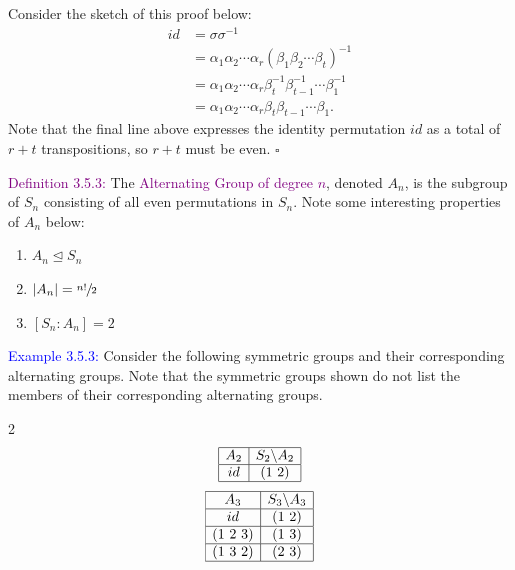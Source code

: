 \documentclass{article}
\begin{document}
Consider the sketch of this proof below:
\begin{align*}
    id &= \sigma \sigma^{-1} \\
    &= \alpha_1 \alpha_2 \cdots \alpha_r (\beta_1 \beta_2 \cdots \beta_t)^{-1} \\
    &= \alpha_1 \alpha_2 \cdots \alpha_r \beta_t^{-1} \beta_{t-1}^{-1} \cdots \beta_1^{-1} \\
    &= \alpha_1 \alpha_2 \cdots \alpha_r \beta_t \beta_{t-1} \cdots \beta_1.
\end{align*}
Note that the final line above expresses the identity permutation $id$ as a total of $r+t$ transpositions, so $r+t$ must be even. $\square$

\textcolor{purple}{Definition 3.5.3:} The \textcolor{purple}{Alternating Group of degree $n$}, denoted $A_n$, is the subgroup of $S_n$ 
consisting of all even permutations in $S_n$. Note some interesting properties of $A_n$ below:
\begin{enumerate}
    \item $A_n \trianglelefteq S_n$
    \item $|A_n|=\sfrac{n!}{2}$
    \item $[S_n:A_n]=2$
\end{enumerate}

\textcolor{blue}{Example 3.5.3:} Consider the following symmetric groups and their corresponding alternating groups. Note that the 
symmetric groups shown do not list the members of their corresponding alternating groups.
\begin{multicols}{2}
    \[
        \begin{array}{|c|c|}
            \hline 
            A_2 & S_2 \backslash A_2 \\
            \hline 
            id & (1 \ 2) \\
            \hline
        \end{array}
    \]
    \columnbreak
    \[
        \begin{array}{|c|c|}
            \hline 
            A_3 & S_3 \backslash A_3 \\
            \hline 
            id & (1 \ 2) \\
            \hline
            (1 \ 2 \ 3) & (1 \ 3) \\
            \hline
            (1 \ 3 \ 2) & (2 \ 3) \\
            \hline
        \end{array}
    \]
\end{multicols}
\end{document}
